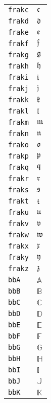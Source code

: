 \begin{longtable}{ll}
\texttt{frakc}&${}\mathfrak{c} {}$\\
\texttt{frakd}&${}\mathfrak{d} {}$\\
\texttt{frake}&${}\mathfrak{e} {}$\\
\texttt{frakf}&${}\mathfrak{f} {}$\\
\texttt{frakg}&${}\mathfrak{g} {}$\\
\texttt{frakh}&${}\mathfrak{h} {}$\\
\texttt{fraki}&${}\mathfrak{i} {}$\\
\texttt{frakj}&${}\mathfrak{j} {}$\\
\texttt{frakk}&${}\mathfrak{k} {}$\\
\texttt{frakl}&${}\mathfrak{l} {}$\\
\texttt{frakm}&${}\mathfrak{m} {}$\\
\texttt{frakn}&${}\mathfrak{n} {}$\\
\texttt{frako}&${}\mathfrak{o} {}$\\
\texttt{frakp}&${}\mathfrak{p} {}$\\
\texttt{frakq}&${}\mathfrak{q} {}$\\
\texttt{frakr}&${}\mathfrak{r} {}$\\
\texttt{fraks}&${}\mathfrak{s} {}$\\
\texttt{frakt}&${}\mathfrak{t} {}$\\
\texttt{fraku}&${}\mathfrak{u} {}$\\
\texttt{frakv}&${}\mathfrak{v} {}$\\
\texttt{frakw}&${}\mathfrak{w} {}$\\
\texttt{frakx}&${}\mathfrak{x} {}$\\
\texttt{fraky}&${}\mathfrak{y} {}$\\
\texttt{frakz}&${}\mathfrak{z} {}$\\
\texttt{bbA}&${}\mathbb{A}{}$\\
\texttt{bbB}&${}\mathbb{B}{}$\\
\texttt{bbC}&${}\mathbb{C}{}$\\
\texttt{bbD}&${}\mathbb{D}{}$\\
\texttt{bbE}&${}\mathbb{E}{}$\\
\texttt{bbF}&${}\mathbb{F}{}$\\
\texttt{bbG}&${}\mathbb{G}{}$\\
\texttt{bbH}&${}\mathbb{H}{}$\\
\texttt{bbI}&${}\mathbb{I}{}$\\
\texttt{bbJ}&${}\mathbb{J}{}$\\
\texttt{bbK}&${}\mathbb{K}{}$\\

\end{longtable}
